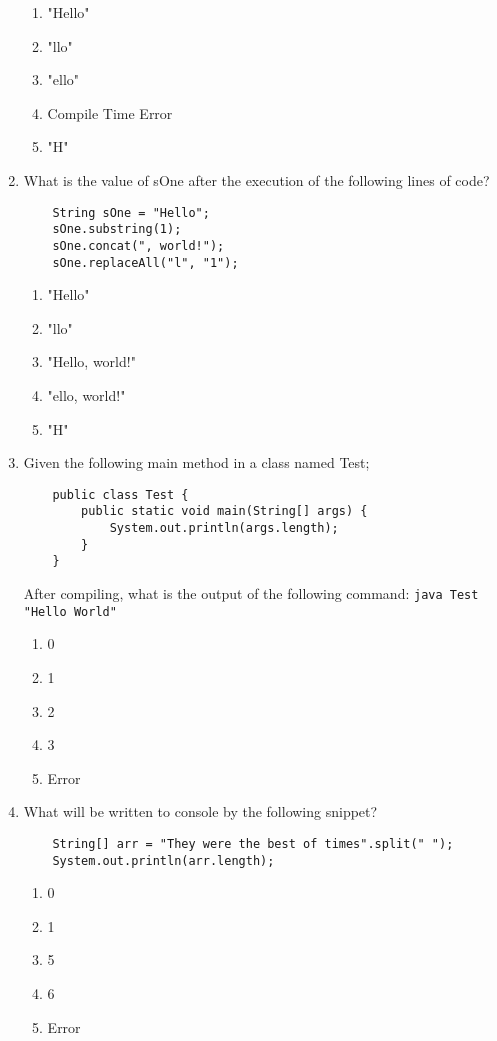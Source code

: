 \documentclass[S17-Final.tex]{subfiles}
\begin{document}
\begin{enumerate}
\begin{enumerate}
\item "Hello"
\item "llo"
\item "ello"
\item Compile Time Error
\item "H"
\end{enumerate}

\item What is the value of sOne after the execution of the following lines of code?
\begin{lstlisting}
    String sOne = "Hello";
    sOne.substring(1);
    sOne.concat(", world!");
    sOne.replaceAll("l", "1");
\end{lstlisting}

\begin{enumerate}
\item "Hello"
\item "llo"
\item "Hello, world!"
\item "ello, world!"
\item "H"
\end{enumerate}

\item Given the following main method in a class named Test;
\begin{lstlisting}
    public class Test {
	    public static void main(String[] args) {
		    System.out.println(args.length);
	    }
    }
\end{lstlisting}
	After compiling, what is the output of the following command: 
	\texttt{java Test "Hello World"}
\begin{enumerate}
\item 0
\item 1
\item 2
\item 3
\item Error
\end{enumerate}

\item What will be written to console by the following snippet?
\begin{lstlisting}
    String[] arr = "They were the best of times".split(" ");
    System.out.println(arr.length);

\end{lstlisting}
	
\begin{enumerate}
\item 0
\item 1
\item 5
\item 6
\item Error
\end{enumerate}


\end{enumerate}
\end{document}
